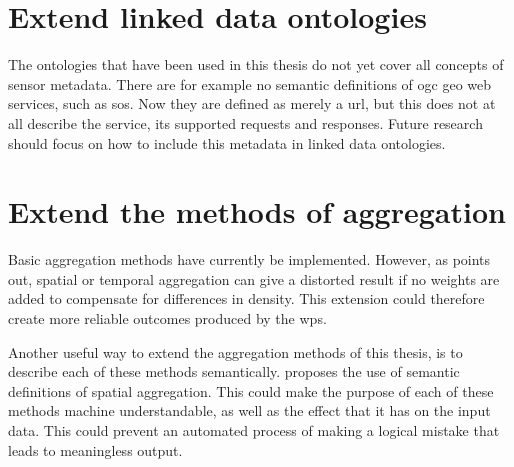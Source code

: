 \section{Extend linked data ontologies}
The ontologies that have been used in this thesis do not yet cover all concepts of sensor metadata. There are for example no semantic definitions of \ac{ogc} geo web services, such as \ac{sos}. Now they are defined as merely a \ac{url}, but this does not at all describe the service, its supported requests and responses. Future research should focus on how to include this metadata in linked data ontologies.    

\section{Extend the methods of aggregation}
\label{par:FRaggregation}

Basic aggregation methods have currently be implemented. However, as \cite{SW:Ganesan} points out, spatial or temporal aggregation can give a distorted result if no weights are added to compensate for differences in density. This extension could therefore create more reliable outcomes produced by the \ac{wps}. 

Another useful way to extend the aggregation methods of this thesis, is to describe each of these methods semantically. \cite{SSW:Stasch4} proposes the use of semantic definitions of spatial aggregation. This could make the purpose of each of these methods machine understandable, as well as the effect that it has on the input data. This could prevent an automated process of making a logical mistake that leads to meaningless output. 
